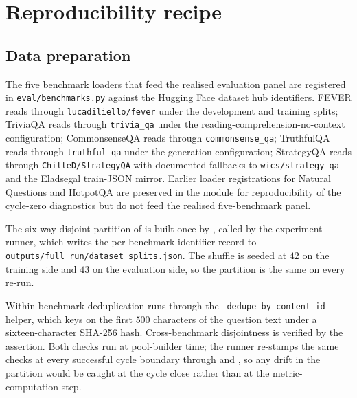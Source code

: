 
\chapter{Reproducibility recipe}
\label{app:reproducibility}

\section{Data preparation}
\label{app:repro-data}

The five benchmark loaders that feed the realised evaluation panel are registered in \verb|eval/benchmarks.py| against the Hugging Face dataset hub identifiers. FEVER reads through \verb|lucadiliello/fever| under the development and training splits; TriviaQA reads through \verb|trivia_qa| under the reading-comprehension-no-context configuration; CommonsenseQA reads through \verb|commonsense_qa|; TruthfulQA reads through \verb|truthful_qa| under the generation configuration; StrategyQA reads through \verb|ChilleD/StrategyQA| with documented fallbacks to \verb|wics/strategy-qa| and the Eladsegal train-JSON mirror. Earlier loader registrations for Natural Questions and HotpotQA are preserved in the module for reproducibility of the cycle-zero diagnostics but do not feed the realised five-benchmark panel.

The six-way disjoint partition of  is built once by , called by the experiment runner, which writes the per-benchmark identifier record to \verb|outputs/full_run/dataset_splits.json|. The shuffle is seeded at $42$ on the training side and $43$ on the evaluation side, so the partition is the same on every re-run.

Within-benchmark deduplication runs through the \verb|_dedupe_by_content_id| helper, which keys on the first $500$ characters of the question text under a sixteen-character SHA-256 hash. Cross-benchmark disjointness is verified by the  assertion. Both checks run at pool-builder time; the runner re-stamps the same checks at every successful cycle boundary through  and , so any drift in the partition would be caught at the cycle close rather than at the metric-computation step.

